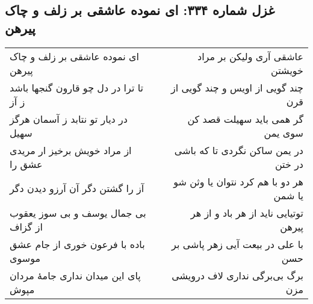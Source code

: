 \begin{center}
\section*{غزل شماره ۳۳۴: ای نموده عاشقی بر زلف و چاک پیرهن}
\label{sec:334}
\begin{longtable}{l p{0.5cm} r}
ای نموده عاشقی بر زلف و چاک پیرهن
&&
عاشقی آری ولیکن بر مراد خویشتن
\\
تا ترا در دل چو قارون گنجها باشد ز آز
&&
چند گویی از اویس و چند گویی از قرن
\\
در دیار تو نتابد ز آسمان هرگز سهیل
&&
گر همی باید سهیلت قصد کن سوی یمن
\\
از مراد خویش برخیز ار مریدی عشق را
&&
در یمن ساکن نگردی تا که باشی در ختن
\\
آز را گشتن دگر آن آرزو دیدن دگر
&&
هر دو با هم کرد نتوان یا وثن شو یا شمن
\\
بی جمال یوسف و بی سوز یعقوب از گزاف
&&
توتیایی ناید از هر باد و از هر پیرهن
\\
باده با فرعون خوری از جام عشق موسوی
&&
با علی در بیعت آیی زهر پاشی بر حسن
\\
پای این میدان نداری جامهٔ مردان مپوش
&&
برگ بی‌برگی نداری لاف درویشی مزن
\\
\end{longtable}
\end{center}

